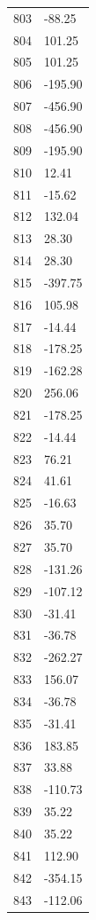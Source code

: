 \documentclass[a4paper,11pt]{article}
\begin{document}
\begin{center}
\begin{longtable}{|R{1.5cm}|R{2.5cm}|}
  803 &       -88.25 \\
  804 &       101.25 \\
  805 &       101.25 \\
  806 &      -195.90 \\
  807 &      -456.90 \\
  808 &      -456.90 \\
  809 &      -195.90 \\
  810 &        12.41 \\
  811 &       -15.62 \\
  812 &       132.04 \\
  813 &        28.30 \\
  814 &        28.30 \\
  815 &      -397.75 \\
  816 &       105.98 \\
  817 &       -14.44 \\
  818 &      -178.25 \\
  819 &      -162.28 \\
  820 &       256.06 \\
  821 &      -178.25 \\
  822 &       -14.44 \\
  823 &        76.21 \\
  824 &        41.61 \\
  825 &       -16.63 \\
  826 &        35.70 \\
  827 &        35.70 \\
  828 &      -131.26 \\
  829 &      -107.12 \\
  830 &       -31.41 \\
  831 &       -36.78 \\
  832 &      -262.27 \\
  833 &       156.07 \\
  834 &       -36.78 \\
  835 &       -31.41 \\
  836 &       183.85 \\
  837 &        33.88 \\
  838 &      -110.73 \\
  839 &        35.22 \\
  840 &        35.22 \\
  841 &       112.90 \\
  842 &      -354.15 \\
  843 &      -112.06 \\

\end{longtable}
\end{center}
\end{document}

